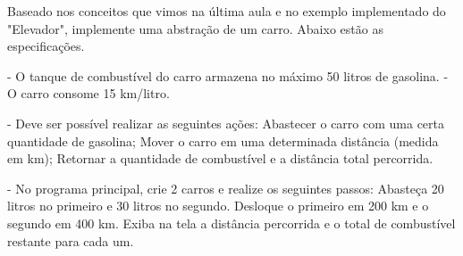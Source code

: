 Baseado nos conceitos que vimos na última aula e no exemplo implementado do "Elevador", implemente uma abstração de um carro. Abaixo estão as especificações.

-  O tanque de combustível do carro armazena no máximo 50 litros de gasolina.
-  O carro consome 15 km/litro.
   
-  Deve ser possível realizar as seguintes ações:
        Abastecer o carro com uma certa quantidade de gasolina;
        Mover o carro em uma determinada distância (medida em km);
        Retornar a quantidade de combustível e a distância total percorrida.
   
-  No programa principal, crie 2 carros e realize os seguintes passos:
        Abasteça 20 litros no primeiro e 30 litros no segundo.
        Desloque o primeiro em 200 km e o segundo em 400 km.
        Exiba na tela a distância percorrida e o total de combustível restante para cada um.